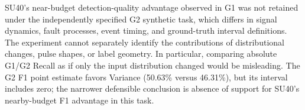 SU40's near-budget detection-quality advantage observed in G1 was not retained under the independently specified G2 synthetic task, which differs in signal dynamics, fault processes, event timing, and ground-truth interval definitions. The experiment cannot separately identify the contributions of distributional changes, pulse shapes, or label geometry. In particular, comparing absolute G1/G2 Recall as if only the input distribution changed would be misleading. The G2 F1 point estimate favors Variance (50.63\% versus 46.31\%), but its interval includes zero; the narrower defensible conclusion is absence of support for SU40's nearby-budget F1 advantage in this task.
